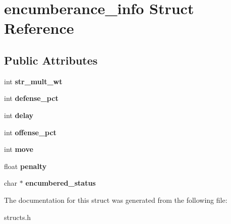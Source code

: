 \hypertarget{structencumberance__info}{\section{encumberance\-\_\-info Struct Reference}
\label{structencumberance__info}
}
\subsection*{Public Attributes}
\begin{DoxyCompactItemize}
\item 
\hypertarget{structencumberance__info_aa2ea8e741a58ad10c50eb074fb35bfb2}{int {\bfseries str\-\_\-mult\-\_\-wt}}\label{structencumberance__info_aa2ea8e741a58ad10c50eb074fb35bfb2}

\item 
\hypertarget{structencumberance__info_af06509d4e25c3b78fc3e33f8b707d499}{int {\bfseries defense\-\_\-pct}}\label{structencumberance__info_af06509d4e25c3b78fc3e33f8b707d499}

\item 
\hypertarget{structencumberance__info_aab6d07743a554bf638808d3b03f32b85}{int {\bfseries delay}}\label{structencumberance__info_aab6d07743a554bf638808d3b03f32b85}

\item 
\hypertarget{structencumberance__info_add8426edbd9a6eecfb81c2fa07a7ad75}{int {\bfseries offense\-\_\-pct}}\label{structencumberance__info_add8426edbd9a6eecfb81c2fa07a7ad75}

\item 
\hypertarget{structencumberance__info_a88e17151ed64a63d9d0333949f0dc988}{int {\bfseries move}}\label{structencumberance__info_a88e17151ed64a63d9d0333949f0dc988}

\item 
\hypertarget{structencumberance__info_a2d805428c874845ca9df5a9c8d3b6345}{float {\bfseries penalty}}\label{structencumberance__info_a2d805428c874845ca9df5a9c8d3b6345}

\item 
\hypertarget{structencumberance__info_afaf76f823787c7af302e587b657c096a}{char $\ast$ {\bfseries encumbered\-\_\-status}}\label{structencumberance__info_afaf76f823787c7af302e587b657c096a}

\end{DoxyCompactItemize}


The documentation for this struct was generated from the following file\-:\begin{DoxyCompactItemize}
\item 
structs.\-h\end{DoxyCompactItemize}
